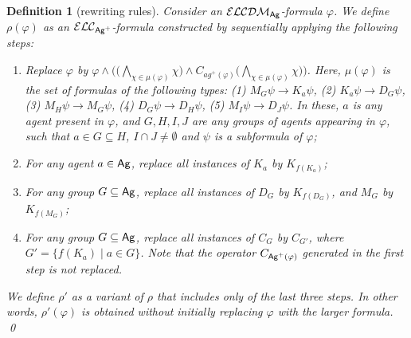 \documentclass{article}
\newtheorem{definition}[theorem]{Definition}%
\newcommand{\ag}{\text{\normalfont\textsf{Ag}}\xspace}
\renewcommand{\phi}{\varphi}
\newcommand{\ra}{\rightarrow}
\newcommand{\langc}{\ensuremath{\mathcal{ELC}}\xspace}
\newcommand{\langcdm}{\ensuremath{\mathcal{ELCDM}}\xspace}
\begin{document}
\begin{definition}[rewriting rules]
\label{def:re1}
Consider an $\langcdm_\ag$-formula $\phi$. We define $\rho(\phi)$ as an $\langc_{\ag^+}$-formula constructed by sequentially applying the following steps:
\begin{enumerate}
\item Replace $\phi$ by $\phi \wedge \big( \big( \bigwedge_{\chi \in \mu(\phi)} \chi \big) \wedge C_{ag^+(\phi)} \big(\bigwedge_{\chi \in \mu(\phi)}\chi \big) \big)$. Here, $\mu(\phi)$ is the set of formulas of the following types:
(1) $M_G \psi \ra K_a\psi$, (2) $K_a\psi \ra D_G\psi$, (3) $M_H\psi \ra M_G\psi$, (4) $D_G \psi \ra D_H\psi$, (5) $M_I\psi \ra D_J\psi$.
In these, $a$ is any agent present in $\phi$, and $G, H, I, J$ are any groups of agents appearing in $\phi$, such that $a \in G \subseteq H$, $I \cap J \neq \emptyset$ and $\psi$ is a subformula of $\phi$;

\item For any agent $a \in \ag$, replace all instances of $K_a$ by $K_{f(K_a)}$;

\item For any group $G \subseteq \ag$, replace all instances of $D_G$ by $K_{f(D_G)}$, and $M_G$ by $K_{f(M_G)}$;

\item For any group $G \subseteq \ag$, replace all instances of $C_G$ by $C_{G'}$, where $G' = \{ f(K_a) \mid a \in G\}$. Note that the operator $C_{\ag^+(\phi)}$ generated in the first step is not replaced.
\end{enumerate}

We define $\rho'$ as a variant of $\rho$ that includes only of the last three steps. In other words, $\rho'(\phi)$ is obtained without initially replacing $\phi$ with the larger formula.
\qed
\end{definition}
\end{document}
